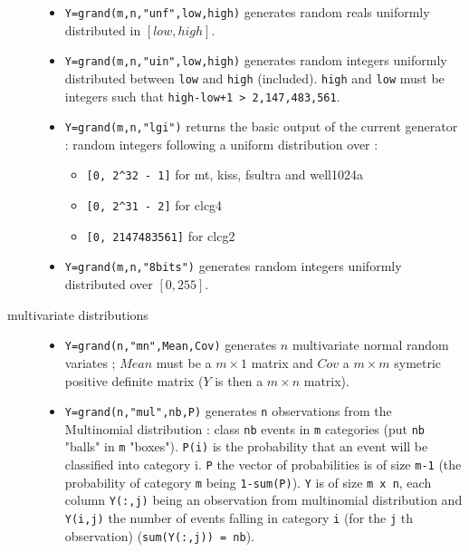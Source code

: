 \begin{description}
\begin{itemize}
\item {} \verb!Y=grand(m,n,"unf",low,high)! generates random reals uniformly distributed 
    in $[low, high]$.

\item {} \verb!Y=grand(m,n,"uin",low,high)! generates random integers uniformly 
      distributed between \verb!low! and \verb!high! (included). \verb!high!
      and \verb!low! must be integers such that \verb!high-low+1 > 2,147,483,561!.

\item {} \verb!Y=grand(m,n,"lgi")! returns the basic output of the current generator : random integers  
      following a uniform distribution over : 
      \begin{itemize}
      \item \verb![0, 2^32 - 1]! for mt, kiss, fsultra and well1024a
      \item \verb![0, 2^31 - 2]! for clcg4
      \item \verb![0, 2147483561]! for clcg2
      \end{itemize}

\item {} \verb!Y=grand(m,n,"8bits")! generates random integers uniformly 
      distributed over $[0,255]$.
\end{itemize}

\item[multivariate distributions]
\begin{itemize}
\item {}
  \verb!Y=grand(n,"mn",Mean,Cov)! generates  $n$ multivariate normal random variates ; 
  $Mean$ must be a $m \times 1$ matrix and $Cov$ a  $m \times m$ 
  symetric positive definite matrix  ($Y$ is then a  $m \times n$
  matrix).

\item {} 
   \verb!Y=grand(n,"mul",nb,P)! generates \verb!n! observations from the Multinomial 
  distribution :  class \verb!nb! events in \verb!m! categories (put \verb!nb!
  "balls" in \verb!m! "boxes"). \verb!P(i)! is the probability 
  that an event will be classified into category i. \verb!P! the vector of probabilities
  is of size  \verb!m-1! (the probability of category \verb!m! being \verb!1-sum(P)!).
  \verb!Y! is of size \verb!m x n!, each column \verb!Y(:,j)! being an observation 
  from multinomial distribution and \verb!Y(i,j)! the number of events falling in category 
  \verb!i! (for the \verb!j! th observation) (\verb!sum(Y(:,j)) = nb!).
  

\end{itemize}
\end{description}
